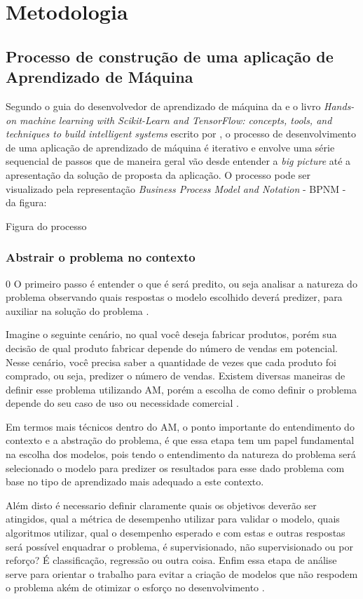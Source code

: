 \chapter{Metodologia}
\section{Processo de construção de uma aplicação de Aprendizado de Máquina}

Segundo o guia do desenvolvedor de aprendizado de máquina da \cite{Amazon} e o livro \textit{Hands-on machine learning with Scikit-Learn and TensorFlow: concepts, tools, and techniques to build intelligent systems} escrito por \cite{geron2017hands}, o processo de desenvolvimento de uma aplicação de aprendizado de máquina é iterativo e envolve uma série sequencial de passos que de maneira geral vão desde entender a \textit{big picture} até a apresentação da solução de proposta da aplicação. O processo pode ser visualizado pela representação \textit{Business Process Model and Notation} - BPNM - da figura:

Figura do processo

\subsection{Abstrair o problema no contexto}
0
O primeiro passo é entender o que é será predito, ou seja analisar a natureza do problema observando quais respostas o modelo escolhido deverá predizer, para auxiliar na solução do problema \cite{geron2017hands}.

Imagine o seguinte cenário, no qual você deseja fabricar produtos, porém sua decisão de qual produto fabricar depende do número de vendas em potencial. Nesse cenário, você precisa saber a quantidade de vezes que cada produto foi comprado, ou seja, predizer o número de vendas. Existem diversas maneiras de definir esse problema utilizando AM, porém a escolha de como definir o problema depende do seu caso de uso ou necessidade comercial \cite{Amazon}.

Em termos mais técnicos dentro do AM, o ponto importante do entendimento do contexto e a abstração do problema, é que essa etapa tem um papel fundamental na escolha dos modelos, pois tendo o entendimento da natureza do problema será selecionado o modelo para predizer os resultados para esse dado problema com base no tipo de aprendizado mais adequado a este contexto.

Além disto é necessario definir claramente quais os objetivos deverão ser atingidos, qual a métrica de desempenho utilizar para validar o modelo, quais algoritmos utilizar, qual o desempenho esperado e com estas e outras respostas será possível enquadrar o problema, é supervisionado, não supervisionado ou por reforço? É classificação, regressão ou outra coisa\cite{geron2017hands}. Enfim essa etapa de análise serve para orientar o trabalho para evitar a criação de modelos que não respodem o problema akém de otimizar o esforço no desenvolvimento \cite{Amazon}.

